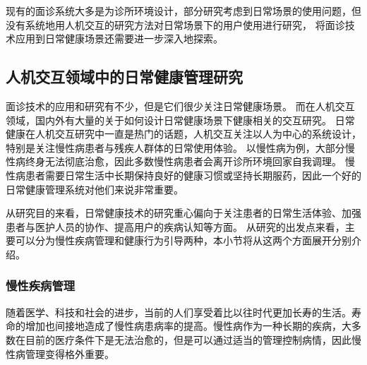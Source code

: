 现有的面诊系统大多是为诊所环境设计，部分研究考虑到日常场景的使用问题，但没有系统地用人机交互的研究方法对日常场景下的用户使用进行研究，
将面诊技术应用到日常健康场景还需要进一步深入地探索。

\subsection{人机交互领域中的日常健康管理研究}
面诊技术的应用和研究有不少，但是它们很少关注日常健康场景。
而在人机交互领域，国内外有大量的关于如何设计日常健康场景下健康相关的交互研究。
日常健康在人机交互研究中一直是热门的话题，人机交互关注以人为中心的系统设计，特别是关注慢性病患者与残疾人群体的日常使用体验。
以慢性病为例，大部分慢性病终身无法彻底治愈，因此多数慢性病患者会离开诊所环境回家自我调理。
慢性病患者需要日常生活中长期保持良好的健康习惯或坚持长期服药，因此一个好的日常健康管理系统对他们来说非常重要。




从研究目的来看，日常健康技术的研究重心偏向于关注患者的日常生活体验、加强患者与医护人员的协作、提高用户的疾病认知等方面\cite{nunes2015self-care}。
从研究的出发点来看，主要可以分为慢性疾病管理和健康行为引导两种\cite{nunes2015self-care}，本小节将从这两个方面展开分别介绍。

\subsubsection{慢性疾病管理}
随着医学、科技和社会的进步，当前的人们享受着比以往时代更加长寿的生活\cite{OlshanskyDEMOGRAPHY}。寿命的增加也间接地造成了慢性病患病率的提高\cite{world2012world}。慢性病作为一种长期的疾病，大多数在目前的医疗条件下是无法治愈的，但是可以通过适当的管理控制病情，因此慢性病管理变得格外重要。

